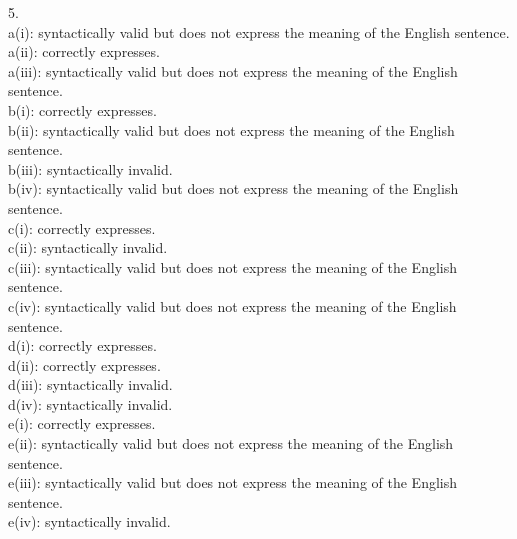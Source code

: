 \documentclass[a4paper]{article}
\begin{document}
\begin{enumerate}[1.]
5.\\
a(i): syntactically valid but does not express the meaning of the English sentence.\\
a(ii): correctly expresses.\\
a(iii): syntactically valid but does not express the meaning of the English sentence.\\
b(i): correctly expresses.\\
b(ii): syntactically valid but does not express the meaning of the English sentence.\\
b(iii): syntactically invalid.\\
b(iv): syntactically valid but does not express the meaning of the English sentence.\\
c(i): correctly expresses.\\
c(ii): syntactically invalid.\\
c(iii): syntactically valid but does not express the meaning of the English sentence.\\
c(iv): syntactically valid but does not express the meaning of the English sentence.\\
d(i): correctly expresses.\\
d(ii): correctly expresses.\\
d(iii): syntactically invalid.\\
d(iv): syntactically invalid.\\
e(i): correctly expresses.\\
e(ii): syntactically valid but does not express the meaning of the English sentence.\\
e(iii): syntactically valid but does not express the meaning of the English sentence.\\
e(iv): syntactically invalid.\\


\end{enumerate}
\end{document}
